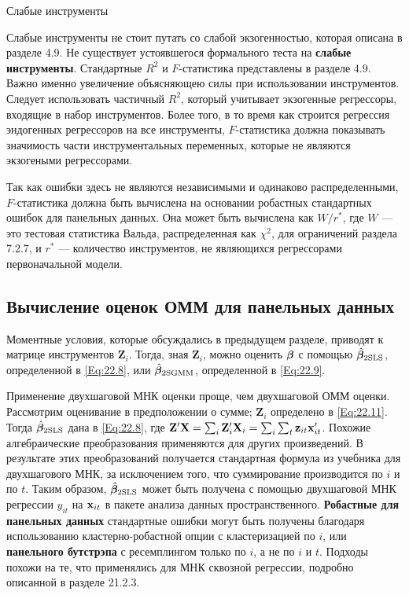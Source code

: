 {\centering  Слабые инструменты}
 

Слабые инструменты не стоит путать со слабой экзогенностью, которая описана в разделе 4.9. Не существует устоявшегося формального теста на \textbf{слабые инструменты}. Стандартные $R^2$ и $F$-статистика представлены в разделе 4.9. Важно именно увеличение объясняющею силы при использовании инструментов. Следует использовать частичный $R^2$, который учитывает экзогенные регрессоры, входящие в набор инструментов. Более того, в то время как строится регрессия эндогенных регрессоров на  все инструменты, $F$-статистика должна показывать значимость части инструментальных переменных, которые не являются экзогеными регрессорами.

Так как ошибки здесь  не являются независимыми и одинаково распределенными, $F$-статистика должна быть вычислена на основании робастных стандартных ошибок для  панельных данных. Она может быть вычислена как $W/r^*$, где $W$  --- это тестовая статистика Вальда, распределенная как $\chi^2$, для ограничений раздела 7.2.7, и $r^*$ --- количество инструментов, не являющихся регрессорами первоначальной модели.

\subsection{Вычисление оценок ОММ для панельных данных}

Моментные условия, которые обсуждались в предыдущем разделе, приводят к матрице инструментов $\mathbf Z_i$. Тогда, зная $\mathbf Z_i$, можно оценить $\bm{\beta}$ с помощью $\hat{\bm{\beta}}_{\mathrm{2SLS}}$, определенной в \ref{Eq:22.8}, или $\hat{\bm{\beta}}_{\mathrm{2SGMM}}$, определенной в \ref{Eq:22.9}.

Применение двухшаговой МНК оценки проще, чем двухшаговой ОММ оценки. Рассмотрим оценивание в предположении о сумме; $\mathbf Z_i$ определено в \ref{Eq:22.11}. Тогда $\hat{\bm{\beta}}_{\mathrm{2SLS}}$ дана в \ref{Eq:22.8}, где $\mathbf Z' \mathbf X =\sum_i \mathbf Z_i' \mathbf X_i=\sum_i \sum_t \mathbf z_{it} \mathbf{x}'_{it}$. Похожие алгебраические преобразования применяются для других произведений. В результате этих преобразований получается стандартная формула из учебника для двухшагового МНК, за исключением того, что суммирование производится по $i$ и по $t$. Таким образом, $\hat{\bm{\beta}}_{\mathrm{2SLS}}$ может быть получена с помощью двухшаговой МНК регрессии $y_{it}$ на $\mathbf{x}_{it}$ в пакете анализа данных пространственного. \textbf{Робастные для панельных данных} стандартные ошибки могут быть получены благодаря использованию кластерно-робастной опции с кластеризацией по $i$, или \textbf{панельного бутстрэпа} с ресемплингом только по $i$, а не по  $i$ и $t$. Подходы похожи на те, что применялись для МНК сквозной регрессии, подробно описанной в разделе 21.2.3. 

